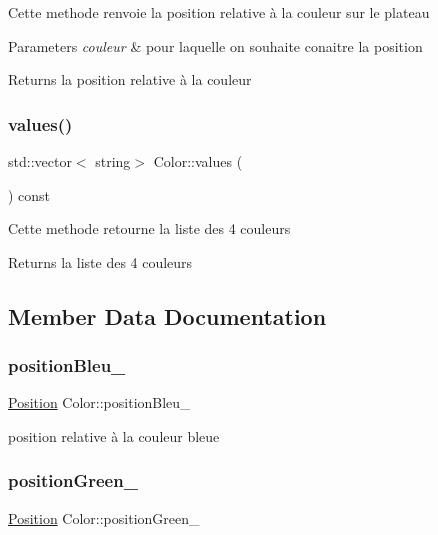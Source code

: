 Cette methode renvoie la position relative à la couleur sur le plateau 
\begin{DoxyParams}{Parameters}
{\em couleur} & pour laquelle on souhaite conaitre la position \\
\hline
\end{DoxyParams}
\begin{DoxyReturn}{Returns}
la position relative à la couleur 
\end{DoxyReturn}
\mbox{\label{class_color_a0c7d2ce54b76091762d9a5f5208fee0f}} 
\subsubsection{\texorpdfstring{values()}{values()}}
{\footnotesize\ttfamily std\+::vector$<$ string$>$ Color\+::values (\begin{DoxyParamCaption}{ }\end{DoxyParamCaption}) const\hspace{0.3cm}{\ttfamily [inline]}}

Cette methode retourne la liste des 4 couleurs \begin{DoxyReturn}{Returns}
la liste des 4 couleurs 
\end{DoxyReturn}


\subsection{Member Data Documentation}
\mbox{\label{class_color_a46d0d39d9c76652c959ad76412519307}} 
\subsubsection{\texorpdfstring{positionBleu\_}{positionBleu\_}}
{\footnotesize\ttfamily \mbox{\hyperlink{class_position}{Position}} Color\+::position\+Bleu\+\_\+\hspace{0.3cm}{\ttfamily [private]}}

position relative à la couleur bleue \mbox{\label{class_color_a670c8d42b6eb3fa43a2fea9976fa72a9}} 
\subsubsection{\texorpdfstring{positionGreen\_}{positionGreen\_}}
{\footnotesize\ttfamily \mbox{\hyperlink{class_position}{Position}} Color\+::position\+Green\+\_\+\hspace{0.3cm}{\ttfamily [private]}}

